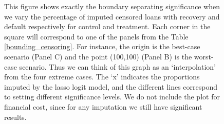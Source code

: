 \begin{figure}[H]
     This figure shows exactly the boundary separating significance when we vary the percentage of imputed censored loans with recovery and default respectively for control and treatment. Each corner in the square will correspond to one of the panels from the Table \ref{bounding_censoring}. For instance, the origin is the best-case scenario (Panel C) and the point (100,100) (Panel B) is the worst-case scenario. Thus we can think of this graph as an `interpolation' from the four extreme cases. The `x' indicates the proportions imputed by the lasso logit model, and the different lines correspond to setting different significance levels. We do not include the plot for financial cost, since for any imputation we still have significant results.

\end{figure}





